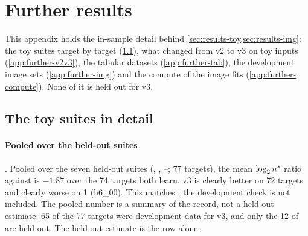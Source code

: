 \section{Further results}\label{app:further}

This appendix holds the in-sample detail behind \cref{sec:results-toy,sec:results-img}: the toy suites target by target (\cref{app:further-toy}), what changed from v2 to v3 on toy inputs (\cref{app:further-v2v3}), the tabular datasets (\cref{app:further-tab}), the development image sets (\cref{app:further-img}) and the compute of the image fits (\cref{app:further-compute}). None of it is held out for v3.

\subsection{The toy suites in detail}\label{app:further-toy}

\paragraph{Pooled over the held-out suites} . Pooled over the seven held-out suites (, , --; 77 targets), the mean $\log_2n^{*}$ ratio against  is $-1.87$ over the 74 targets both learn. v3 is clearly better on 72 targets and clearly worse on 1 (h6\_00). This matches ; the development check  is not included. The pooled number is a summary of the record, not a held-out estimate: 65 of the 77 targets were development data for v3, and only the 12 of  are held out. The held-out estimate is the  row alone.

